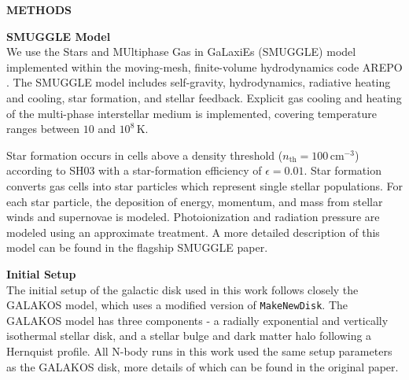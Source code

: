 \documentclass{natureprintstyle}
\begin{document}

\newpage

\setcounter{page}{1}
\setcounter{figure}{0}
\setcounter{table}{0}
\captionsetup[figure]{labelformat=empty}
\renewcommand{\thefigure}{Extended Data \arabic{figure}}
\renewcommand{\thetable}{Extended Data \arabic{table}}

\begin{center}
{\bf \Large \uppercase{Methods} }
\end{center}

\noindent
{\bf SMUGGLE Model}
\\
\noindent
We use the Stars and MUltiphase Gas in GaLaxiEs (SMUGGLE) model
\cite{2019MNRAS.489.4233M} implemented within the moving-mesh, finite-volume
hydrodynamics code AREPO \cite{2010MNRAS.401..791S}. The SMUGGLE model
includes self-gravity, hydrodynamics, radiative heating and cooling, star
formation, and stellar feedback. Explicit gas cooling and heating of the
multi-phase interstellar medium is implemented, covering temperature ranges
between $10$ and $10^8\,\textrm{K}$.

Star formation occurs in cells above a density threshold
($n_{\textrm{th}}=100\,\textrm{cm}^{-3}$) according to SH03 with a
star-formation efficiency of $\epsilon = 0.01$. Star formation converts gas
cells into star particles which represent single stellar populations. For each
star particle, the deposition of energy, momentum, and mass from stellar winds
and supernovae is modeled. Photoionization and radiation pressure are modeled
using an approximate treatment. A more detailed description of this model can
be found in the flagship SMUGGLE paper.\cite{2019MNRAS.489.4233M}

\vspace{12pt}

\noindent
{\bf Initial Setup}
\\
\noindent
The initial setup of the galactic disk used in this work follows closely the
GALAKOS model\cite{2020ApJ...890..117D}, which uses a modified version of
\texttt{MakeNewDisk}.\cite{2005MNRAS.361..776S} The GALAKOS model has three
components - a radially exponential and vertically isothermal stellar disk,
and a stellar bulge and dark matter halo following a Hernquist
profile.\cite{1990ApJ...356..359H} All N-body runs in this work used the same
setup parameters as the GALAKOS disk, more details of which can be found in
the original paper.
\end{document}
